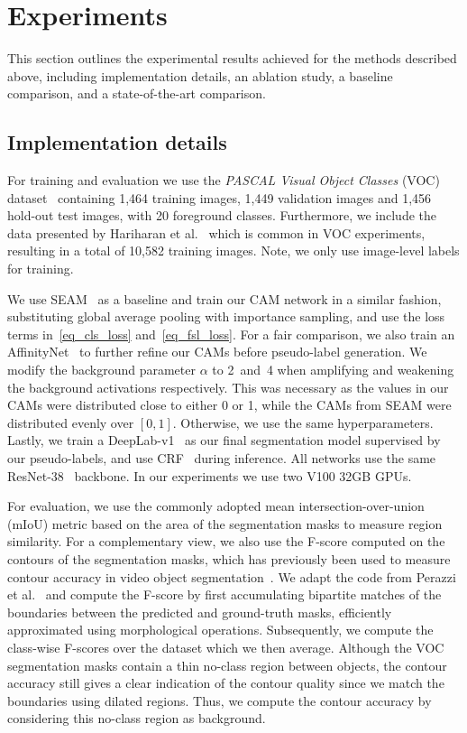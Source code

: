 \documentclass{article}
\begin{document}
\section{Experiments}

This section outlines the experimental results achieved for the methods described above, including implementation details, an ablation study, a baseline comparison, and a state-of-the-art comparison.

\subsection{Implementation details}
\label{sec_implementation_details}

For training and evaluation we use the \textit{PASCAL Visual Object Classes} (VOC) dataset~\cite{everingham2010ijvc} containing 1,464 training images, 1,449 validation images and 1,456 hold-out test images, with 20 foreground classes. Furthermore, we include the data presented by Hariharan et al.~\cite{hariharan2011iccv} which is common in VOC experiments, resulting in a total of 10,582 training images. Note, we only use image-level labels for training.

We use SEAM~\cite{wang2020cvpr} as a baseline and train our CAM network in a similar fashion, substituting global average pooling with importance sampling, and use the loss terms in~\eqref{eq_cls_loss} and~\eqref{eq_fsl_loss}. For a fair comparison, we also train an AffinityNet~\cite{ahn2018cvpr} to further refine our CAMs before pseudo-label generation. We modify the background parameter $\alpha$ to 2~and~4 when amplifying and weakening the background activations respectively. This was necessary as the values in our CAMs were distributed close to either 0 or 1, while the CAMs from SEAM were distributed evenly over $[0, 1]$. Otherwise, we use the same hyperparameters. Lastly, we train a DeepLab-v1~\cite{chen2015iclr} as our final segmentation model supervised by our pseudo-labels, and use CRF~\cite{krahenbuhl2011neurips} during inference. All networks use the same ResNet-38~\cite{wu2019pr} backbone. In our experiments we use two V100 32GB GPUs.

For evaluation, we use the commonly adopted mean intersection-over-union (mIoU) metric based on the area of the segmentation masks to measure region similarity. For a complementary view, we also use the F-score computed on the contours of the segmentation masks, which has previously been used to measure contour accuracy in video object segmentation~\cite{perazzi2016cvpr}. We adapt the code from Perazzi et al.~\cite{perazzi2016cvpr} and compute the F-score by first accumulating bipartite matches of the boundaries between the predicted and ground-truth masks, efficiently approximated using morphological operations. Subsequently, we compute the class-wise F-scores over the dataset which we then average. Although the VOC segmentation masks contain a thin no-class region between objects, the contour accuracy still gives a clear indication of the contour quality since we match the boundaries using dilated regions. Thus, we compute the contour accuracy by considering this no-class region as background.
\end{document}
